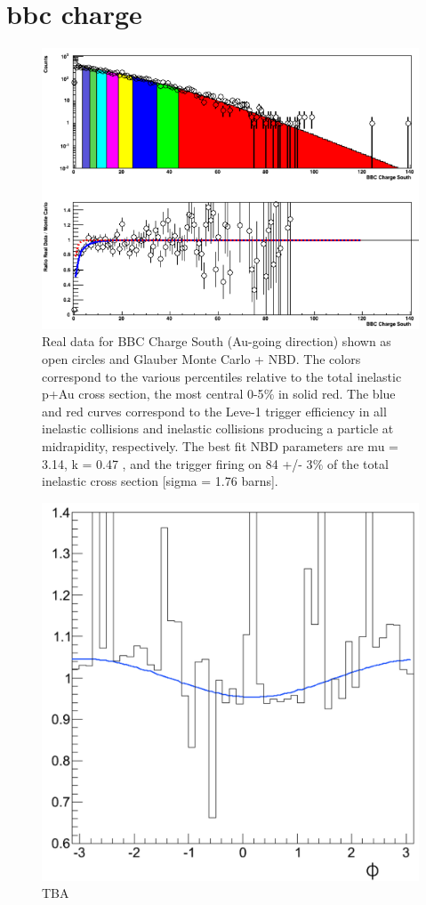 \section{bbc charge}
\begin{figure}[!h]
\begin{center}
\includegraphics[width=0.65\linewidth]{figs/centrality_determination.png}
\caption{Real data for BBC Charge South (Au-going direction) shown as open circles and Glauber Monte Carlo + NBD. The colors correspond to the various
percentiles relative to the total inelastic p+Au cross section, the most central 0-5$\%$ in solid red. The blue and red curves correspond to the Leve-1 trigger
efficiency in all inelastic collisions and inelastic collisions producing a particle at midrapidity, respectively. The best fit NBD parameters are mu = 3.14, k = 0.47
, and the trigger firing on 84 +/- 3$\%$ of the total inelastic cross section [sigma = 1.76 barns].}
\end{center}
\end{figure}
\begin{figure}[!h]
\begin{center}
\includegraphics[width=0.5\linewidth]{figs/comparison_of_weights.png}
\caption{TBA}
\end{center}
\end{figure}
